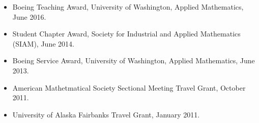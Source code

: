 \documentclass{article}
\begin{document}
\begin{itemize}
  \setlength{\itemsep}{0pt}
  \item Boeing Teaching Award, University of Washington, Applied
    Mathematics, June 2016.
  \item Student Chapter Award, Society for Industrial and Applied Mathematics
    (SIAM), June 2014.
  \item Boeing Service Award, University of Washington, Applied
    Mathematics, June 2013.
  \item American Mathetmatical Society Sectional Meeting Travel Grant,
    October 2011.
  \item University of Alaska Fairbanks Travel Grant, January 2011.
\end{itemize}
\end{document}
